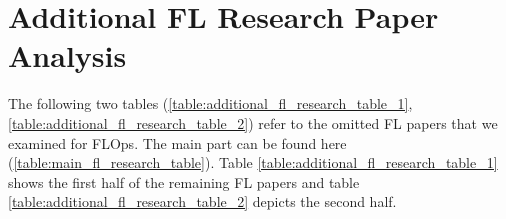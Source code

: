 \appendix
\appendixpage
\addappheadtotoc

\chapter{Additional FL Research Paper Analysis}\label{appendix:data-collection}
The following two tables (\ref{table:additional_fl_research_table_1}, \ref{table:additional_fl_research_table_2}) refer to the omitted FL papers that we examined for FLOps.
The main part can be found here (\ref{table:main_fl_research_table}).
Table \ref{table:additional_fl_research_table_1} shows the first half of the remaining FL papers and
table \ref{table:additional_fl_research_table_2} depicts the second half.


